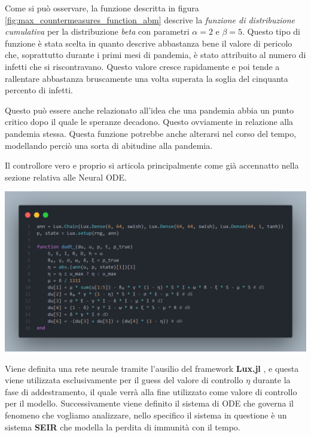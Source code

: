 Come si può osservare, la funzione descritta in figura \ref{fig:max_countermeasures_function_abm} 
descrive la \emph{funzione di distribuzione cumulativa} per la distribuzione \emph{beta}  
con parametri $\alpha = 2$ e $\beta = 5$. Questo tipo di funzione è stata scelta in quanto descrive abbastanza 
bene il valore di pericolo che, soprattutto durante i primi mesi di pandemia, è stato attribuito al numero di infetti che 
si riscontravano. Questo valore cresce rapidamente e poi tende a rallentare abbastanza bruscamente una volta superata la 
soglia del cinquanta percento di infetti. 

Questo può essere anche relazionato all'idea che una pandemia abbia un punto critico dopo il quale le speranze decadono. Questo 
ovviamente in relazione alla pandemia stessa. Questa funzione potrebbe anche alterarsi nel corso del tempo, modellando perciò 
una sorta di abitudine alla pandemia. 

Il controllore vero e proprio si articola principalmente come già accennatto nella sezione relativa alle Neural ODE. 

\begin{minipage}{\linewidth}
	\centering
	\includegraphics[width=\textwidth]{img/controller1.png}
	\label{fig:controller1}
\end{minipage}

Viene definita una rete neurale tramite l'ausilio del framework \textbf{Lux.jl} \cite{pal2023lux}, e questa viene utilizzata
esclusivamente per il guess del valore di controllo $\eta$ durante la fase di addestramento, il quale verrà 
alla fine utilizzato come valore di controllo per il modello. Successivamente viene definito il sistema di ODE che governa il fenomeno che vogliamo analizzare, nello specifico il sistema in 
questione è un sistema \textbf{SEIR} che modella la perdita di immunità con il tempo. 

